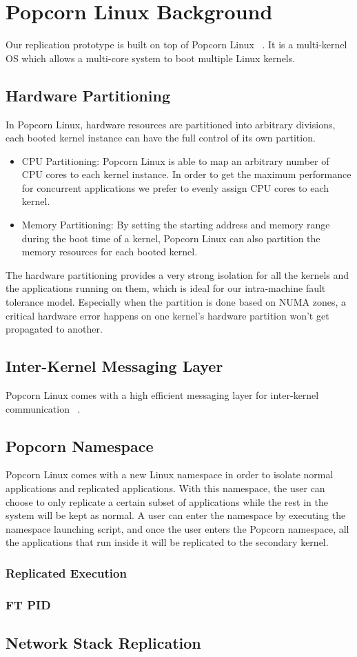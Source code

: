 \chapter{Popcorn Linux Background}
Our replication prototype is built on top of Popcorn Linux ~\cite{barbalace2014popcorn}. It is a multi-kernel OS which allows a multi-core system to boot multiple Linux kernels.
\section{Hardware Partitioning}
In Popcorn Linux, hardware resources are partitioned into arbitrary divisions, each booted kernel instance can have the full control of its own partition.

\begin{itemize}
\item{CPU Partitioning:} Popcorn Linux is able to map an arbitrary number of CPU cores to each kernel instance. In order to get the maximum performance for concurrent applications we prefer to evenly assign CPU cores to each kernel.

\item{Memory Partitioning:} By setting the starting address and memory range during the boot time of a kernel, Popcorn Linux can also partition the memory resources for each booted kernel.
\end{itemize}

The hardware partitioning provides a very strong isolation for all the kernels and the applications running on them, which is ideal for our intra-machine fault tolerance model. Especially when the partition is done based on NUMA zones, a critical hardware error happens on one kernel's hardware partition won't get propagated to another.

\section{Inter-Kernel Messaging Layer}
Popcorn Linux comes with a high efficient messaging layer for inter-kernel communication ~\cite{shelton2013popcorn}.

\section{Popcorn Namespace}
Popcorn Linux comes with a new Linux namespace in order to isolate normal applications and replicated applications. With this namespace, the user can choose to only replicate a certain subset of applications while the rest in the system will be kept as normal. A user can enter the namespace by executing the namespace launching script, and once the user enters the Popcorn namespace, all the applications that run inside it will be replicated to the secondary kernel.
\subsection{Replicated Execution}


\subsection{FT PID}
\section{Network Stack Replication}
